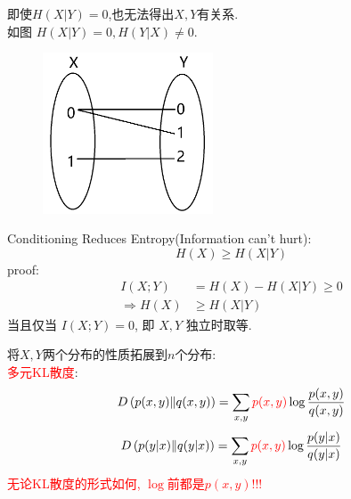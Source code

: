 \begin{proposition}
即使$H(X|Y)=0$,也无法得出$X,Y$有关系.\\
如图 $H(X|Y)=0,H(Y|X)\neq 0$.
\begin{figure}[htbp]
    \centering
    \includegraphics[width=0.45\textwidth]{./figures/chapter1/conditional_entropy_0.png}
\end{figure}
\end{proposition}

\begin{proposition}
Conditioning Reduces Entropy(Information can't hurt):\\
$$H(X)\geq H(X|Y)$$
proof:
\begin{align*}
I(X;Y) &= H(X) - H(X|Y) \geq 0 \\
\Rightarrow H(X) &\geq H(X|Y)
\end{align*}
当且仅当 $I(X;Y)=0$, 即 $X,Y$ 独立时取等.
\end{proposition}

将$X,Y$两个分布的性质拓展到$n$个分布:\\
\textcolor{red}{多元KL散度}:
$$D\left(p(x,y)\|q(x,y)\right)=\sum_{x,y}\textcolor{red}{p(x,y)}\log\dfrac{p(x,y)}{q(x,y)}$$
$$D\left(p(y|x)\|q(y|x)\right)=\sum_{x,y}\textcolor{red}{p(x,y)}\log\dfrac{p(y|x)}{q(y|x)}$$
\textcolor{red}{无论KL散度的形式如何, $\log$前都是$p(x,y)$!!!}

